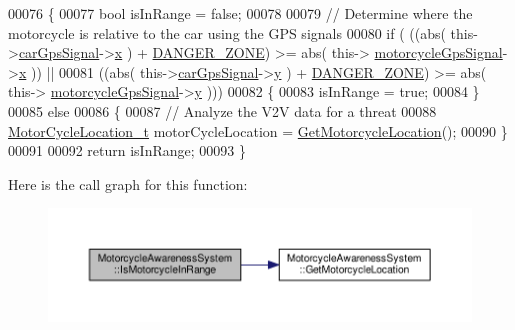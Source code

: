 \begin{DoxyCode}
00076 \{
00077     \textcolor{keywordtype}{bool} isInRange = \textcolor{keyword}{false};
00078 
00079     \textcolor{comment}{// Determine where the motorcycle is relative to the car using the GPS signals}
00080     \textcolor{keywordflow}{if} ( ((abs( this->\hyperlink{classMotorcycleAwarenessSystem_a9a8185e00b60d0be58bfa76166063128}{carGpsSignal}->\hyperlink{structGpsSignal__t_a6f7bd3c500b55923ab335ada4b6b26eb}{x} ) + \hyperlink{classMotorcycleAwarenessSystem_abe0296f34c0ca2857a94659dfdc5801c}{DANGER\_ZONE}) >= abs( this->
      \hyperlink{classMotorcycleAwarenessSystem_ab281a3993b574923b2f379ed0477b2d4}{motorcycleGpsSignal}->\hyperlink{structGpsSignal__t_a6f7bd3c500b55923ab335ada4b6b26eb}{x} )) ||
00081          ((abs( this->\hyperlink{classMotorcycleAwarenessSystem_a9a8185e00b60d0be58bfa76166063128}{carGpsSignal}->\hyperlink{structGpsSignal__t_ab9e083be189fc842ed7aa4fdc978e94e}{y} ) + \hyperlink{classMotorcycleAwarenessSystem_abe0296f34c0ca2857a94659dfdc5801c}{DANGER\_ZONE}) >= abs( this->
      \hyperlink{classMotorcycleAwarenessSystem_ab281a3993b574923b2f379ed0477b2d4}{motorcycleGpsSignal}->\hyperlink{structGpsSignal__t_ab9e083be189fc842ed7aa4fdc978e94e}{y} )))
00082     \{
00083         isInRange = \textcolor{keyword}{true};
00084     \}
00085     \textcolor{keywordflow}{else}
00086     \{
00087         \textcolor{comment}{// Analyze the V2V data for a threat}
00088         \hyperlink{structMotorCycleLocation__t}{MotorCycleLocation\_t} motorCycleLocation = 
      \hyperlink{classMotorcycleAwarenessSystem_a840a5bc17d75276ecdb3a39d7aaf4109}{GetMotorcycleLocation}();
00090     \}
00091 
00092     \textcolor{keywordflow}{return} isInRange;
00093 \}
\end{DoxyCode}


Here is the call graph for this function\-:\nopagebreak
\begin{figure}[H]
\begin{center}
\leavevmode
\includegraphics[width=350pt]{classMotorcycleAwarenessSystem_a239655aca9c875b1dbbad3ce155c7892_cgraph}
\end{center}
\end{figure}




